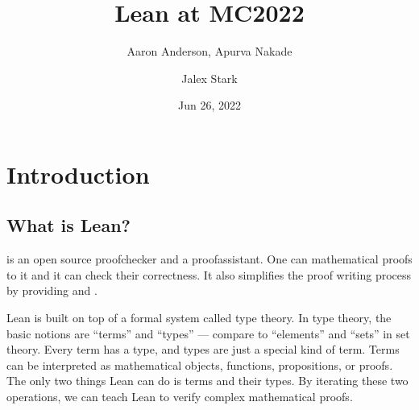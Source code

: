 \documentclass[letterpaper,10pt,english]{sphinxmanual}
\title{Lean at MC2022}
\date{Jun 26, 2022}
\author{Aaron Anderson, Apurva Nakade \and Jalex Stark}
\begin{document}
\pagestyle{empty}
\sphinxmaketitle
\pagestyle{plain}
\sphinxtableofcontents
\pagestyle{normal}
\label{\detokenize{index::doc}}


\sphinxstepscope


\chapter{Introduction}
\label{\detokenize{introduction:introduction}}\label{\detokenize{introduction:id1}}\label{\detokenize{introduction::doc}}

\section{What is Lean?}
\label{\detokenize{introduction:what-is-lean}}
\sphinxAtStartPar
{} is an open source proof\sphinxhyphen{}checker and a proof\sphinxhyphen{}assistant.
One can  mathematical proofs to it and it can check their correctness.
It also simplifies the proof writing process by providing  and .

\sphinxAtStartPar
Lean is built on top of a formal system called type theory.
In type theory, the basic notions are “terms” and “types” — compare to “elements” and “sets” in set theory.
Every term has a type, and types are just a special kind of term.
Terms can be interpreted as mathematical objects, functions, propositions, or proofs.
The only two things Lean can do is  terms and  their types.
By iterating these two operations, we can teach Lean to verify complex mathematical proofs.
\end{document}
